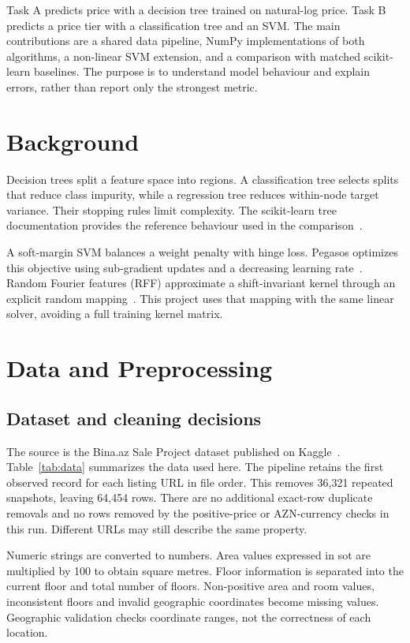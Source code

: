 \documentclass[10pt,twocolumn,a4paper]{article}
\begin{document}
Task A predicts price with a decision tree trained on natural-log price. Task B predicts a price tier with a classification tree and an SVM. The main contributions are a shared data pipeline, NumPy implementations of both algorithms, a non-linear SVM extension, and a comparison with matched scikit-learn baselines. The purpose is to understand model behaviour and explain errors, rather than report only the strongest metric.

\section{Background}
Decision trees split a feature space into regions. A classification tree selects splits that reduce class impurity, while a regression tree reduces within-node target variance. Their stopping rules limit complexity. The scikit-learn tree documentation provides the reference behaviour used in the comparison~\cite{trees}.

A soft-margin SVM balances a weight penalty with hinge loss. Pegasos optimizes this objective using sub-gradient updates and a decreasing learning rate~\cite{pegasos}. Random Fourier features (RFF) approximate a shift-invariant kernel through an explicit random mapping~\cite{rff}. This project uses that mapping with the same linear solver, avoiding a full training kernel matrix.

\section{Data and Preprocessing}
\subsection{Dataset and cleaning decisions}
The source is the Bina.az Sale Project dataset published on Kaggle~\cite{data}. Table~\ref{tab:data} summarizes the data used here. The pipeline retains the first observed record for each listing URL in file order. This removes 36,321 repeated snapshots, leaving 64,454 rows. There are no additional exact-row duplicate removals and no rows removed by the positive-price or AZN-currency checks in this run. Different URLs may still describe the same property.

Numeric strings are converted to numbers. Area values expressed in sot are multiplied by 100 to obtain square metres. Floor information is separated into the current floor and total number of floors. Non-positive area and room values, inconsistent floors and invalid geographic coordinates become missing values. Geographic validation checks coordinate ranges, not the correctness of each location.
\end{document}
